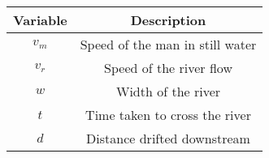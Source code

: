 \begin{tabular}[12pt]{ |c| c|}
    \hline
    \textbf{Variable} & \textbf{Description}\\ 
    \hline
	${v_{m}}$ & Speed of the man in still water\\
    \hline 
	${v_{r}}$ & Speed of the river flow\\
    \hline
        $w$ & Width of the river\\
    \hline
	$t$ & Time taken to cross the river\\
    \hline
	$d$ & Distance drifted downstream\\
    \hline
\end{tabular}
